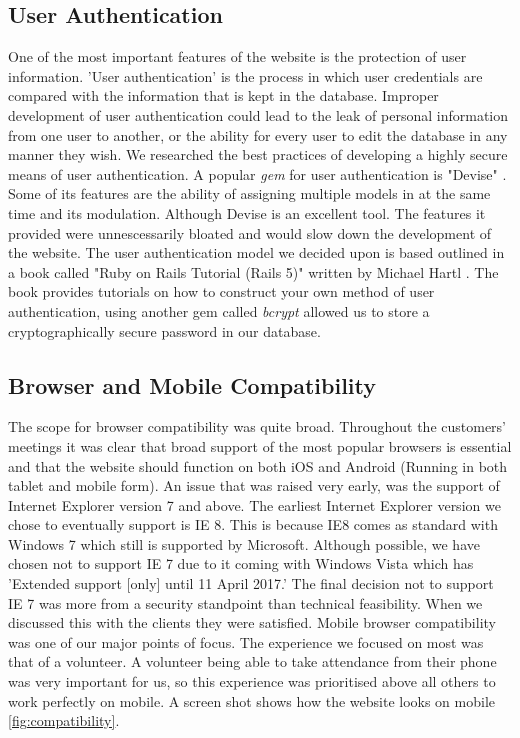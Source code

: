 \documentclass{l3proj}
\begin{document}
\subsection{User Authentication}
\label{sec:authentication}

One of the most important features of the website is the protection of user information. 'User authentication' \cite{authentication} is the process in which user credentials are compared with the information that is kept in the database. Improper development of user authentication could lead to the leak of personal information from one user to another, or the ability for every user to edit the database in any manner they wish. We researched the best practices of developing a highly secure means of user authentication. A popular \textit{gem} for user authentication is "Devise" \cite{devise}. Some of its features are the ability of assigning multiple models in at the same time and its modulation. Although Devise is an excellent tool. The features it provided were unnescessarily bloated and would slow down the development of the website. The user authentication model we decided upon is based outlined in a book called "Ruby on Rails Tutorial (Rails 5)" written by Michael Hartl \cite{railsTut}. The book provides tutorials on how to construct your own method of user authentication, using another gem called \textit{bcrypt} allowed us to store a cryptographically secure password in our database.

\subsection{Browser and Mobile Compatibility}
\label{sec:compatibility}

The scope for browser compatibility was quite broad. Throughout the customers' meetings it was clear that broad support of the most popular browsers is essential and that the website should function on both iOS and Android (Running in both tablet and mobile form).
An issue that was raised very early, was the support of Internet Explorer version 7 and above. The earliest Internet Explorer version we chose to eventually support is IE 8. This is because IE8 comes as standard with Windows 7 which still is supported by Microsoft. Although possible, we have chosen not to support IE 7 due to it coming with Windows Vista which has 'Extended support [only] until 11 April 2017.' The final decision not to support IE 7 was more from a security standpoint than technical feasibility. When we discussed this with the clients they were satisfied. Mobile browser compatibility was one of our major points of focus. The experience we focused on most was that of a volunteer. A volunteer being able to take attendance from their phone was very important for us, so this experience was prioritised above all others to work perfectly on mobile. A screen shot shows how the website looks on mobile \autoref{fig:compatibility}.
\end{document}
